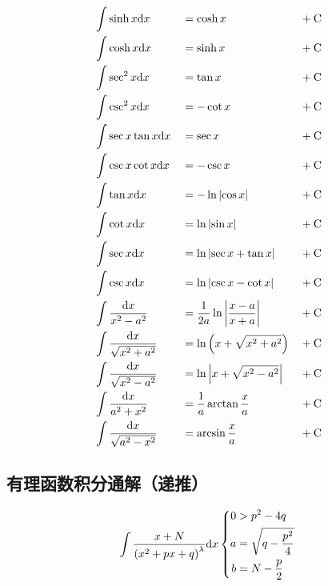 \documentclass{article}
\begin{document}
\[\begin{aligned}
         & \int\sinh x\mathrm d x                 &  & =\cosh x                            &  & +\mathrm C \\
         & \int\cosh x\mathrm d x                 &  & =\sinh x                            &  & +\mathrm C \\
         & \int\sec^2 x\mathrm d x                &  & =\tan x                             &  & +\mathrm C \\
         & \int\csc^2 x\mathrm d x                &  & =-\cot x                            &  & +\mathrm C \\
         & \int\sec x\tan x\mathrm d x            &  & =\sec x                             &  & +\mathrm C \\
         & \int\csc x\cot x\mathrm d x            &  & =-\csc x                            &  & +\mathrm C \\
         & \int\tan x\mathrm d x                  &  & =-\ln\left|\cos x\right|                   &  & +\mathrm C \\
         & \int\cot x\mathrm d x                  &  & =\ln\left|\sin x\right|                    &  & +\mathrm C \\
         & \int\sec x\mathrm d x                  &  & =\ln\left|\sec x+\tan x\right|             &  & +\mathrm C \\
         & \int\csc x\mathrm d x                  &  & =\ln\left|\csc x-\cot x\right|             &  & +\mathrm C \\
         & \int\frac{\mathrm d x}{x^2-a^2}        &  & =\frac1{2a}\ln\left|\frac{x-a}{x+a}\right| &  & +\mathrm C \\
         & \int\frac{\mathrm d x}{\sqrt{x^2+a^2}} &  & =\ln\left(x+\sqrt{x^2+a^2}\right)         &  & +\mathrm C \\
         & \int\frac{\mathrm d x}{\sqrt{x^2-a^2}} &  & =\ln\left|x+\sqrt{x^2-a^2}\right|          &  & +\mathrm C \\
         & \int\frac{\mathrm d x}{a^2+x^2}        &  & =\frac1a\arctan\frac xa             &  & +\mathrm C \\
         & \int\frac{\mathrm d x}{\sqrt{a^2-x^2}} &  & =\arcsin{\frac xa}                  &  & +\mathrm C
    \end{aligned}\]

\subsection{有理函数积分通解（递推）}

\[\int{\frac{x+N}{\left(x^2+px+q\right)^\lambda}\mathrm dx}
    \left\{\begin{aligned}
        0 & >p^2-4q               \\
        a & =\sqrt{q-\frac{p^2}4} \\
        b & =N-\frac p2
    \end{aligned}\right.\]
\end{document}
